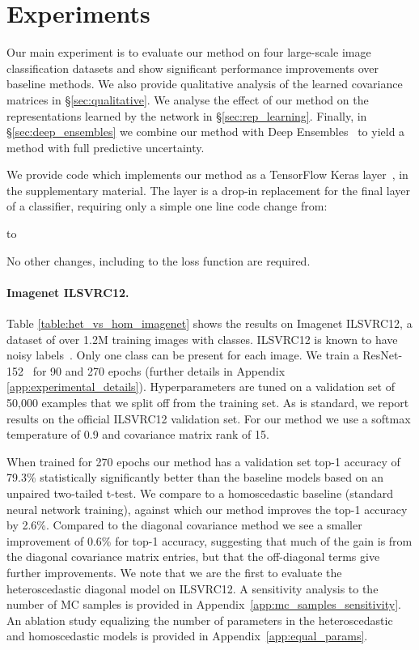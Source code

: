 \documentclass[final]{cvpr}
\begin{document}
\section{Experiments}

Our main experiment is to evaluate our method on four large-scale image classification datasets and show significant performance improvements over baseline methods. We also provide qualitative analysis of the learned covariance matrices in \S \ref{sec:qualitative}. We analyse the effect of our method on the representations learned by the network in \S \ref{sec:rep_learning}. Finally, in \S \ref{sec:deep_ensembles} we combine our method with Deep Ensembles~\cite{lakshminarayanan2017simple} to yield a method with full predictive uncertainty.

We provide code which implements our method as a TensorFlow Keras layer~\cite{abadi2016tensorflow,chollet2015keras}, in the supplementary material. The layer is a drop-in replacement for the final layer of a classifier, requiring only a simple one line code change from:

to

No other changes, including to the loss function are required.

\paragraph{Imagenet ILSVRC12.} Table \ref{table:het_vs_hom_imagenet} shows the results on Imagenet ILSVRC12, a dataset of over 1.2M training images with  classes. ILSVRC12 is known to have noisy labels~\cite{beyer2020we}. Only one class can be present for each image. We train a ResNet-152~\cite{he2016deep} for 90 and 270 epochs (further details in Appendix \ref{app:experimental_details}). Hyperparameters are tuned on a validation set of 50,000 examples that we split off from the training set. As is standard, we report results on the official ILSVRC12 validation set. For our method we use a softmax temperature of 0.9 and covariance matrix rank of 15.

When trained for 270 epochs our method has a validation set top-1 accuracy of 79.3\% statistically significantly better than the baseline models based on an unpaired two-tailed t-test. We compare to a homoscedastic baseline (standard neural network training), against which our method improves the top-1 accuracy by 2.6\%. Compared to the diagonal covariance method we see a smaller improvement of 0.6\% for top-1 accuracy, suggesting that much of the gain is from the diagonal covariance matrix entries, but that the off-diagonal terms give further improvements. We note that we are the first to evaluate the heteroscedastic diagonal model on ILSVRC12. A sensitivity analysis to the number of MC samples is provided in Appendix~\ref{app:mc_samples_sensitivity}. An ablation study equalizing the number of parameters in the heteroscedastic and homoscedastic models is provided in Appendix~\ref{app:equal_params}.
\end{document}
